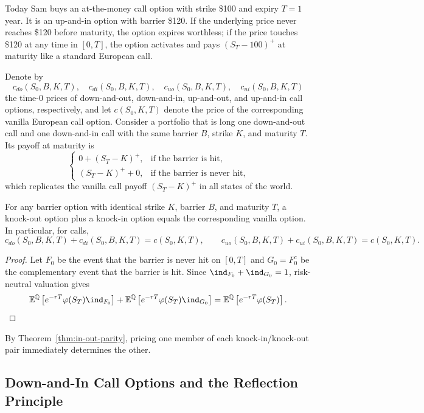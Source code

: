 \begin{example}
    Today Sam buys an at-the-money call option with strike \$100 and expiry $T = 1$ year. It is an up-and-in option with barrier \$120. If the underlying price never reaches \$120 before maturity, the option expires worthless; if the price touches \$120 at any time in $[0, T]$, the option activates and pays $(S_T - 100)^+$ at maturity like a standard European call.
\end{example}

Denote by
\[
c_{do}(S_0, B, K, T), \quad c_{di}(S_0, B, K, T), \quad c_{uo}(S_0, B, K, T), \quad c_{ui}(S_0, B, K, T)
\]
the time-$0$ prices of down-and-out, down-and-in, up-and-out, and up-and-in call options, respectively, and let $c(S_0, K, T)$ denote the price of the corresponding vanilla European call option. Consider a portfolio that is long one down-and-out call and one down-and-in call with the same barrier $B$, strike $K$, and maturity $T$. Its payoff at maturity is
\[
\begin{cases}
    0 + (S_T - K)^+, & \text{if the barrier is hit}, \\
    (S_T - K)^+ + 0, & \text{if the barrier is never hit},
\end{cases}
\]
which replicates the vanilla call payoff $(S_T - K)^+$ in all states of the world.

\begin{theorem}\label{thm:in-out-parity}
    For any barrier option with identical strike $K$, barrier $B$, and maturity $T$, a knock-out option plus a knock-in option equals the corresponding vanilla option. In particular, for calls,
    \[
    c_{do}(S_0, B, K, T) + c_{di}(S_0, B, K, T) = c(S_0, K, T), \qquad c_{uo}(S_0, B, K, T) + c_{ui}(S_0, B, K, T) = c(S_0, K, T).
    \]
\end{theorem}
\begin{proof}
    Let $F_0$ be the event that the barrier is never hit on $[0, T]$ and $G_0 = F_0^c$ be the complementary event that the barrier is hit. Since $\ind_{F_0} + \ind_{G_0} = 1$, risk-neutral valuation gives
    \[
    \E^{\Q}\left[e^{-rT}\varphi(S_T)\ind_{F_0}\right] + \E^{\Q}\left[e^{-rT}\varphi(S_T)\ind_{G_0}\right] = \E^{\Q}\left[e^{-rT}\varphi(S_T)\right]. \qedhere
    \]
\end{proof}

By Theorem~\ref{thm:in-out-parity}, pricing one member of each knock-in/knock-out pair immediately determines the other.

\subsection{Down-and-In Call Options and the Reflection Principle}

